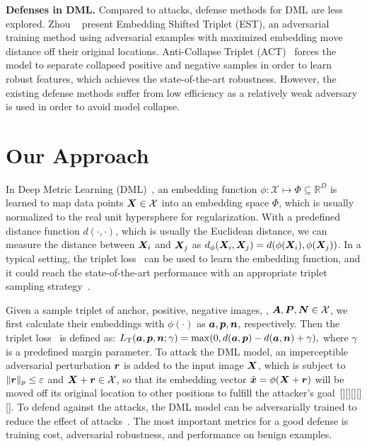 \documentclass[10pt,twocolumn,letterpaper]{article}
\begin{document}
%
\textbf{Defenses in DML.} Compared to attacks, defense methods for DML are less
explored.
%
Zhou \etal~\cite{advrank} present Embedding Shifted Triplet (EST), an
adversarial training method using adversarial examples with maximized embedding
move distance off their original locations.
%
Anti-Collapse Triplet (ACT)~\cite{robrank} forces the model to separate
collapsed positive and negative samples in order to learn robust features,
which achieves the state-of-the-art robustness.
%
However, the existing defense methods suffer from low efficiency as a
relatively weak adversary is used in order to avoid model collapse.

\section{Our Approach}
\label{sec:3}


In Deep Metric Learning (DML)~\cite{revisiting,dmlreality}, an embedding
function $\phi:\mathcal{X}\mapsto \Phi \subseteq \mathbb{R}^D$ is learned to
map data points ${\bm{X}}\in\mathcal{X}$ into an embedding space $\Phi$, which is usually
normalized to the real unit hypersphere for regularization.
%
With a predefined distance function $d(\cdot,\cdot)$, which is usually the
Euclidean distance, we can measure the distance between ${\bm{X}}_i$ and ${\bm{X}}_j$ as
$d_\phi({\bm{X}}_i,{\bm{X}}_j)=d(\phi({\bm{X}}_i),\phi({\bm{X}}_j))$.
%
In a typical setting, the triplet loss~\cite{facenet} can be used to learn the
embedding function, and it could reach the state-of-the-art performance with an
appropriate triplet sampling strategy~\cite{revisiting}.


Given a sample triplet of anchor, positive, negative images, \ie, ${\bm{A}}, {\bm{P}},
{\bm{N}} \in \mathcal{X}$, we first calculate their embeddings with $\phi(\cdot)$ as
${\bm{a}}, {\bm{p}}, {\bm{n}}$, respectively.
%
Then the triplet loss~\cite{facenet} is defined as:
%
$
%
	L_\text{T}(\va, \vp, \vn; \gamma) = \max(0, d(\va, \vp) - d(\va, \vn) +
	\gamma),
%
$
%
where $\gamma$ is a predefined margin parameter.
%
To attack the DML model, an imperceptible adversarial perturbation ${\bm{r}}$ is
added to the input image ${\bm{X}}$, which is subject to $\|{\bm{r}}\|_p \leq
\varepsilon$ and ${\bm{X}}+{\bm{r}}\in \mathcal{X}$, so that its embedding vector
$\tilde{{\bm{x}}}=\phi({\bm{X}}+{\bm{r}})$ will be moved off its original location to other
positions to fulfill the attacker's goal~[][][][][].
%
To defend against the attacks, the DML model can be adversarially trained to
reduce the effect of attacks~\cite{advrank,robrank}.
%
The most important metrics for a good defense is training cost, adversarial
robustness, and performance on benign examples.
\end{document}
